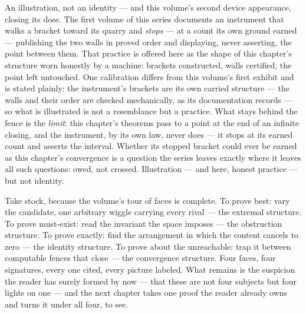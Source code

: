 \begin{fence}
An illustration, not an identity --- and this volume's second device
appearance, closing its dose. The first volume of this series documents
an instrument that walks a bracket toward its quarry and \emph{stops}
--- at a count its own ground earned --- publishing the two walls in
proved order and displaying, never asserting, the point between them.
That practice is offered here as the shape of this chapter's structure
worn honestly by a machine: brackets constructed, walls certified,
the point left untouched. One calibration differs from this volume's
first exhibit and is stated plainly: the instrument's brackets are its
own carried structure --- the walls and their order are checked
mechanically, as its documentation records --- so what is illustrated
is not a resemblance but a practice. What stays behind the fence is the
\emph{limit}: this chapter's theorems pass to a point at the end of an
infinite closing, and the instrument, by its own law, never does --- it
stops at its earned count and asserts the interval. Whether its stopped
bracket could ever be earned as this chapter's convergence is a question
the series leaves exactly where it leaves all such questions: owed, not
crossed. Illustration --- and here, honest practice --- but not
identity.
\end{fence}

Take stock, because the volume's tour of faces is complete. To prove
best: vary the candidate, one arbitrary wiggle carrying every rival ---
the extremal structure. To prove must-exist: read the invariant the
space imposes --- the obstruction structure. To prove exactly: find the
arrangement in which the content cancels to zero --- the identity
structure. To prove about the unreachable: trap it between computable
fences that close --- the convergence structure. Four faces, four
signatures, every one cited, every picture labeled. What remains is the
suspicion the reader has surely formed by now --- that these are not
four subjects but four lights on one --- and the next chapter takes one
proof the reader already owns and turns it under all four, to see.
